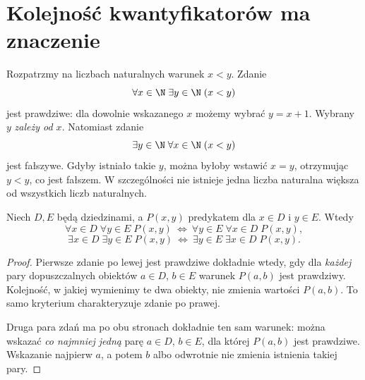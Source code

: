 \section{Kolejność kwantyfikatorów ma znaczenie}
\label{sec:quantifier-order}
\begin{przyklad}
Rozpatrzmy na liczbach naturalnych warunek $x<y$.
Zdanie
\[
\forall x\in\N\;\exists y\in\N\;(x<y)
\]
jest prawdziwe: dla dowolnie wskazanego $x$
możemy wybrać $y=x+1$. Wybrany $y$ \emph{zależy od $x$}.
Natomiast zdanie
\[
\exists y\in\N\;\forall x\in\N\;(x<y)
\]
jest fałszywe. Gdyby istniało takie $y$,
można byłoby wstawić $x=y$, otrzymując $y<y$,
co jest fałszem. W szczególności nie istnieje
jedna liczba naturalna większa od wszystkich
liczb naturalnych.
\end{przyklad}

\begin{twierdzenie}
\label{thm:same-quantifier-order}
Niech $D,E$ będą dziedzinami, a $P(x,y)$ predykatem
dla $x\in D$ i $y\in E$. Wtedy
\[
\forall x\in D\;\forall y\in E\;P(x,y)
\ \Leftrightarrow\
\forall y\in E\;\forall x\in D\;P(x,y),
\]
\[
\exists x\in D\;\exists y\in E\;P(x,y)
\ \Leftrightarrow\
\exists y\in E\;\exists x\in D\;P(x,y).
\]
\end{twierdzenie}
\begin{proof}
Pierwsze zdanie po lewej jest prawdziwe dokładnie
wtedy, gdy dla \emph{każdej} pary dopuszczalnych
obiektów $a\in D$, $b\in E$ warunek $P(a,b)$
jest prawdziwy. Kolejność, w jakiej wymienimy te
dwa obiekty, nie zmienia wartości $P(a,b)$.
To samo kryterium charakteryzuje zdanie po prawej.

Druga para zdań ma po obu stronach dokładnie
ten sam warunek: można wskazać \emph{co najmniej
jedną} parę $a\in D$, $b\in E$, dla której
$P(a,b)$ jest prawdziwe. Wskazanie najpierw $a$,
a potem $b$ albo odwrotnie nie zmienia
istnienia takiej pary.
\end{proof}

